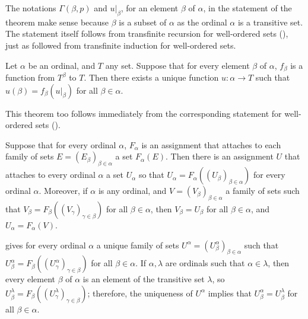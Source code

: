 \documentclass{article}
\begin{document}
The notations \(\Gamma(\beta, p)\) and \(u \vert_\beta\), for an
element \(\beta\) of \(\alpha\), in the statement of the theorem make
sense because \(\beta\) is a subset of \(\alpha\) as the ordinal
\(\alpha\) is a transitive set.  The statement itself follows from
transfinite recursion for well-ordered sets (),
just as  followed from transfinite induction for
well-ordered sets.

\begin{theorem}
  \label{thm:3y2h6l46}
  Let \(\alpha\) be an ordinal, and \(T\) any set.  Suppose that for
  every element \(\beta\) of \(\alpha\), \(f_\beta\) is a function
  from \(T^\beta\) to \(T\).  Then there exists a unique function
  \(u : \alpha \to T\) such that \(u(\beta) = f_\beta(u \vert_\beta)\)
  for all \(\beta \in \alpha\).
\end{theorem}

This theorem too follows immediately from the corresponding statement
for well-ordered sets ().

\begin{theorem}
  \label{thm:fsekzo48}
  Suppose that for every ordinal \(\alpha\), \(F_\alpha\) is an
  assignment that attaches to each family of sets
  \(E = (E_\beta)_{\beta \in \alpha}\) a set \(F_\alpha(E)\).  Then
  there is an assignment \(U\) that attaches to every ordinal
  \(\alpha\) a set \(U_\alpha\) so that
  \(U_\alpha = F_\alpha((U_\beta)_{\beta \in \alpha})\) for every
  ordinal \(\alpha\).  Moreover, if \(\alpha\) is any ordinal, and
  \(V = (V_\beta)_{\beta \in \alpha}\) a family of sets such that
  \(V_\beta = F_\beta((V_\gamma)_{\gamma \in \beta})\) for all
  \(\beta \in \alpha\), then \(V_\beta = U_\beta\) for all
  \(\beta \in \alpha\), and \(U_\alpha = F_\alpha(V)\).
\end{theorem}

 gives for every ordinal \(\alpha\) a unique family
of sets \(U^\alpha = (U^\alpha_\beta)_{\beta \in \alpha}\) such that
\(U^\alpha_\beta = F_\beta((U^\alpha_\gamma)_{\gamma \in \beta})\) for
all \(\beta \in \alpha\).  If \(\alpha, \lambda\) are ordinals such
that \(\alpha \in \lambda\), then every element \(\beta\) of
\(\alpha\) is an element of the transitive set \(\lambda\), so
\(U^\lambda_\beta = F_\beta((U^\lambda_\gamma)_{\gamma \in \beta})\);
therefore, the uniqueness of \(U^\alpha\) implies that
\(U^\alpha_\beta = U^\lambda_\beta\) for all \(\beta \in \alpha\).
\end{document}
